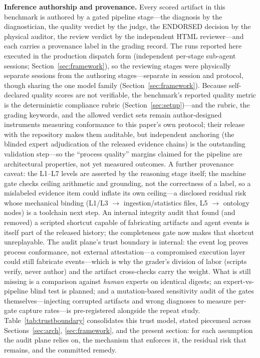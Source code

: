 \documentclass[preprint,10pt]{elsarticle}
\begin{document}
\textbf{Inference authorship and provenance.} Every scored artifact in this benchmark is authored by a gated pipeline stage---the diagnosis by the diagnostician, the quality verdict by the judge, the ENDORSED decision by the physical auditor, the review verdict by the independent HTML reviewer---and each carries a provenance label in the grading record. The runs reported here executed in the production dispatch form (independent per-stage sub-agent sessions; Section~\ref{sec:framework}), so the reviewing stages were physically separate sessions from the authoring stages---separate in session and protocol, though sharing the one model family (Section~\ref{sec:framework}). Because self-declared quality scores are not verifiable, the benchmark's reported quality metric is the deterministic compliance rubric (Section~\ref{sec:setup})---and the rubric, the grading keywords, and the allowed verdict sets remain author-designed instruments measuring conformance to this paper's own protocol; their release with the repository makes them auditable, but independent anchoring (the blinded expert adjudication of the released evidence chains) is the outstanding validation step---so the ``process quality'' margins claimed for the pipeline are architectural properties, not yet measured outcomes. A further provenance caveat: the L1--L7 levels are asserted by the reasoning stage itself; the machine gate checks ceiling arithmetic and grounding, not the correctness of a label, so a mislabeled evidence item could inflate its own ceiling---a disclosed residual risk whose mechanical binding (L1/L3 $\to$ ingestion/statistics files, L5 $\to$ ontology nodes) is a toolchain next step. An internal integrity audit that found (and removed) a scripted shortcut capable of fabricating artifacts and agent events is itself part of the released history; the completeness gate now makes that shortcut unreplayable. The audit plane's trust boundary is internal: the event log proves process conformance, not external attestation---a compromised execution layer could still fabricate events---which is why the grader's division of labor (scripts verify, never author) and the artifact cross-checks carry the weight. What is still missing is a comparison against \emph{human} experts on identical digests; an expert-vs-pipeline blind test is planned; and a mutation-based sensitivity audit of the gates themselves---injecting corrupted artifacts and wrong diagnoses to measure per-gate capture rates---is pre-registered alongside the repeat study. Table~\ref{tab:trustboundary} consolidates this trust model, stated piecemeal across Sections~\ref{sec:arch}, \ref{sec:framework}, and the present section: for each assumption the audit plane relies on, the mechanism that enforces it, the residual risk that remains, and the committed remedy.
\end{document}
